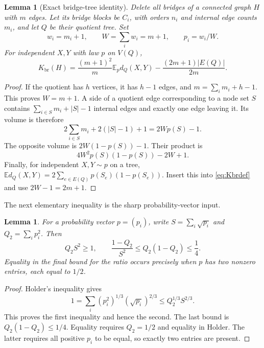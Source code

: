 \documentclass[11pt]{amsart}
\numberwithin{equation}{section}
\newtheorem{lemma}[theorem]{Lemma}
\theoremstyle{definition}
\theoremstyle{remark}
\newcommand{\E}{\mathbb E}
\newcommand{\Kbr}{K_{\mathrm{br}}}
\begin{document}
\begin{lemma}[Exact bridge-tree identity]\label{lem:bridgeidentity}
Delete all bridges of a connected graph $H$ with $m$ edges. Let its bridge blocks be $C_i$, with orders $n_i$ and internal edge counts $m_i$, and let $Q$ be their quotient tree. Set
\begin{equation}\label{eq:weights}
w_i=m_i+1,\qquad W=\sum_iw_i=m+1,\qquad p_i=w_i/W.
\end{equation}
For independent $X,Y$ with law $p$ on $V(Q)$,
\begin{equation}\label{eq:bridgeidentity}
\Kbr(H)=\frac{(m+1)^2}{m}\E_p d_Q(X,Y)
-\frac{(2m+1)|E(Q)|}{2m}.
\end{equation}
\end{lemma}
\begin{proof}
If the quotient has $h$ vertices, it has $h-1$ edges, and $m=\sum_i m_i+h-1$. This proves $W=m+1$. A side of a quotient edge corresponding to a node set $S$ contains $\sum_{i\in S}m_i+|S|-1$ internal edges and exactly one edge leaving it. Its volume is therefore
\[
2\sum_{i\in S}m_i+2(|S|-1)+1=2Wp(S)-1.
\]
The opposite volume is $2W(1-p(S))-1$. Their product is
\[
4W^2p(S)(1-p(S))-2W+1.
\]
Finally, for independent $X,Y\sim p$ on a tree,
$\E d_Q(X,Y)=2\sum_{e\in E(Q)}p(S_e)(1-p(S_e))$.
Insert this into \eqref{eq:Kbrdef} and use $2W-1=2m+1$.
\end{proof}

The next elementary inequality is the sharp probability-vector input.
\begin{lemma}\label{lem:holder}
For a probability vector $p=(p_i)$, write $S=\sum_i\sqrt{p_i}$ and $Q_2=\sum_ip_i^2$. Then
\begin{equation}\label{eq:holder}
Q_2S^2\ge1,\qquad
\frac{1-Q_2}{S^2}\le Q_2(1-Q_2)\le\frac14.
\end{equation}
Equality in the final bound for the ratio occurs precisely when $p$ has two nonzero entries, each equal to $1/2$.
\end{lemma}
\begin{proof}
Holder's inequality gives
\[
1=\sum_i(p_i^2)^{1/3}(\sqrt{p_i})^{2/3}
\le Q_2^{1/3}S^{2/3}.
\]
This proves the first inequality and hence the second. The last bound is $Q_2(1-Q_2)\le1/4$. Equality requires $Q_2=1/2$ and equality in Holder. The latter requires all positive $p_i$ to be equal, so exactly two entries are present.
\end{proof}
\end{document}
